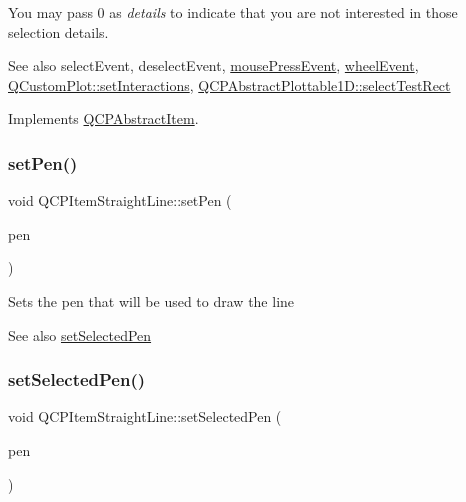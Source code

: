 You may pass 0 as {\itshape details} to indicate that you are not interested in those selection details.

\begin{DoxySeeAlso}{See also}
select\+Event, deselect\+Event, \hyperlink{classQCPLayerable_af6567604818db90f4fd52822f8bc8376}{mouse\+Press\+Event}, \hyperlink{classQCPLayerable_a47dfd7b8fd99c08ca54e09c362b6f022}{wheel\+Event}, \hyperlink{classQCustomPlot_a5ee1e2f6ae27419deca53e75907c27e5}{Q\+Custom\+Plot\+::set\+Interactions}, \hyperlink{classQCPAbstractPlottable1D_a22377bf6e57ab7eedbc9e489250c6ded}{Q\+C\+P\+Abstract\+Plottable1\+D\+::select\+Test\+Rect} 
\end{DoxySeeAlso}


Implements \hyperlink{classQCPAbstractItem_ae41d0349d68bb802c49104afd100ba2a}{Q\+C\+P\+Abstract\+Item}.

\mbox{\label{classQCPItemStraightLine_a9f36c9c9e60d7d9ac084c80380ac8601}} 
\subsubsection{\texorpdfstring{set\+Pen()}{setPen()}}
{\footnotesize\ttfamily void Q\+C\+P\+Item\+Straight\+Line\+::set\+Pen (\begin{DoxyParamCaption}\item[{const Q\+Pen \&}]{pen }\end{DoxyParamCaption})}

Sets the pen that will be used to draw the line

\begin{DoxySeeAlso}{See also}
\hyperlink{classQCPItemStraightLine_a5c33559498d33543fa95cf0a36e851ff}{set\+Selected\+Pen} 
\end{DoxySeeAlso}
\mbox{\label{classQCPItemStraightLine_a5c33559498d33543fa95cf0a36e851ff}} 
\subsubsection{\texorpdfstring{set\+Selected\+Pen()}{setSelectedPen()}}
{\footnotesize\ttfamily void Q\+C\+P\+Item\+Straight\+Line\+::set\+Selected\+Pen (\begin{DoxyParamCaption}\item[{const Q\+Pen \&}]{pen }\end{DoxyParamCaption})}

